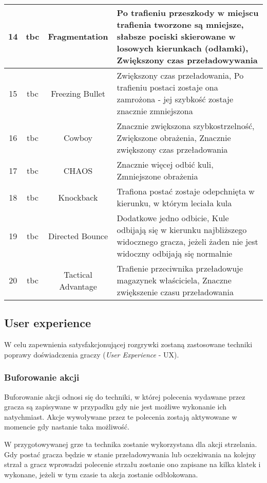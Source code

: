 \begin{table}
\begin{tabularx}{\linewidth}{|c|c|c|X|}
        \hline 
        14 & tbc & Fragmentation & Po trafieniu przeszkody w miejscu trafienia tworzone są mniejsze, słabsze pociski skierowane w losowych kierunkach (odłamki), Zwiększony czas przeładowywania\\
        \hline 
        15 & tbc & Freezing Bullet & Zwiększony czas przeładowania, Po trafieniu postaci zostaje ona zamrożona - jej szybkość zostaje znacznie zmniejszona \\
        \hline 
        16 & tbc & Cowboy & Znacznie zwiększona szybkostrzelność, Zwiększone obrażenia, Znacznie zwiększony czas przeładowania \\
        \hline 
        17 & tbc & CHAOS & Znacznie więcej odbić kuli, Zmniejszone obrażenia \\
        \hline 
        18 & tbc & Knockback & Trafiona postać zostaje odepchnięta w kierunku, w którym leciała kula \\
        \hline 
        19 & tbc & Directed Bounce & Dodatkowe jedno odbicie, Kule odbijają się w kierunku najbliższego widocznego gracza, jeżeli żaden nie jest widoczny odbijają się normalnie \\
        \hline 
        20 & tbc & Tactical Advantage & Trafienie przeciwnika przeładowuje magazynek właściciela, Znaczne zwiększenie czasu przeładowania \\
        \hline 
    \end{tabularx}
\end{table}

\subsection{User experience}%

W celu zapewnienia satysfakcjonującej rozgrywki zostaną zastosowane techniki poprawy doświadczenia graczy (\emph{User Experience} - UX). 

\subsubsection{Buforowanie akcji}

Buforowanie akcji odnosi się do techniki, w której polecenia wydawane przez gracza są zapisywane w przypadku gdy nie jest możliwe wykonanie ich natychmiast. Akcje wywoływane przez te polecenia zostają aktywowane w momencie gdy nastanie taka możliwość. \cite{input_buffering}

W przygotowywanej grze ta technika zostanie wykorzystana dla akcji strzelania. Gdy postać gracza będzie w stanie przeładowywania lub oczekiwania na kolejny strzał a gracz wprowadzi polecenie strzału zostanie ono zapisane na kilka klatek i wykonane, jeżeli w tym czasie ta akcja zostanie odblokowana. 

